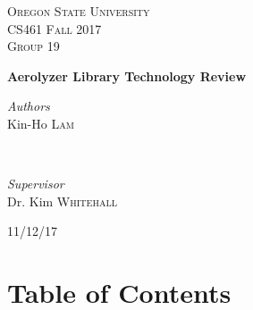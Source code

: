 \documentclass[onecolumn, draftclsnofoot,10pt, compsoc]{IEEEtran}
\begin{document}
	\begin{titlepage}

	\center

	\textsc{\LARGE Oregon State University}\\[1.5cm]
	\textsc{\Large CS461 Fall 2017 }\\[0.5cm]
	\textsc{\large Group 19}\\[0.5cm] %

	\vfill

	{\huge\bfseries Aerolyzer Library Technology Review}\\[0.4cm]

	\vfill

	\begin{minipage}{0.4\textwidth}
		\begin{flushleft}
			\large
			\textit{Authors}\\
			Kin-Ho \textsc{Lam}\\
		\end{flushleft}
	\end{minipage}
	~
	\begin{minipage}{0.4\textwidth}
		\begin{flushright}
			\large
			\textit{Supervisor}\\
			Dr. Kim \textsc{Whitehall}
		\end{flushright}
	\end{minipage}

	\vfill

	\begin{abstract}
		\begin{singlespace}
			This document discusses possible technologies the Aerolyzer project shall leverage to accomplish horizon detection, aerosol content inference, and data analysis.
		\end{singlespace}
	\end{abstract}

	\vfill
	\vfill
	\vfill
	{\large11/12/17}
	\vfill
\end{titlepage}

\section{Table of Contents}
\tableofcontents
\clearpage
\end{document}
